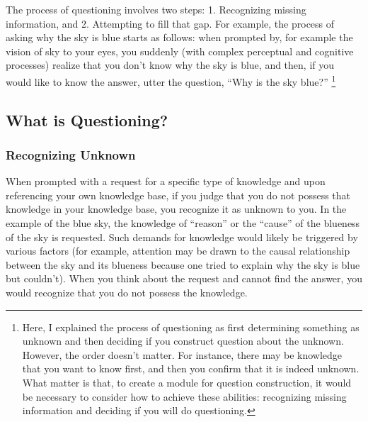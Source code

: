 

The process of questioning involves two steps: 1. Recognizing missing information, and 2. Attempting to fill that gap. For example, the process of asking why the sky is blue starts as follows: when prompted by, for example the vision of sky to your eyes, you suddenly (with complex perceptual and cognitive processes) realize that you don't know why the sky is blue, and then, if you would like to know the answer, utter the question, ``Why is the sky blue?'' \footnote{
Here, I explained the process of questioning as first determining something as unknown and then deciding if you construct question about the unknown. However, the order doesn't matter. For instance, there may be knowledge that you want to know first, and then you confirm that it is indeed unknown. What matter is that, to create a module for question construction, it would be necessary to consider how to achieve these abilities: recognizing missing information and deciding if you will do questioning. 
}

\subsection{What is Questioning?}
\subsubsection{Recognizing Unknown}
When prompted with a request for a specific type of knowledge and upon referencing your own knowledge base, if you judge that you do not possess that knowledge in your knowledge base, you recognize it as unknown to you. In the example of the blue sky, the knowledge of ``reason'' or the ``cause'' of the blueness of the sky is requested. Such demands for knowledge would likely be triggered by various factors (for example, attention may be drawn to the causal relationship between the sky and its blueness because one tried to explain why the sky is blue but couldn't). When you think about the request and cannot find the answer, you would recognize that you do not possess the knowledge. 

